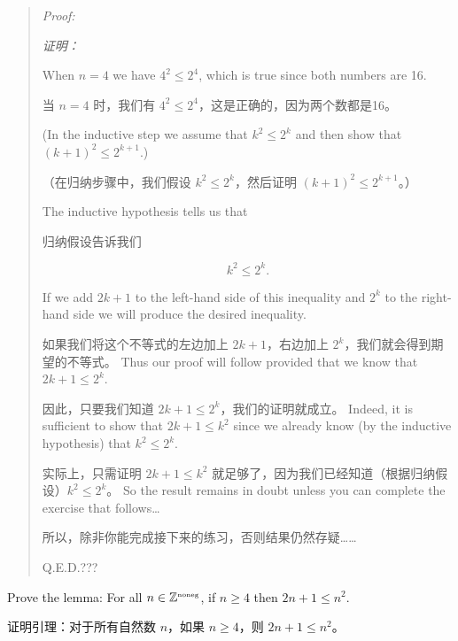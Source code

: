 \begin{quote} \emph{Proof:}

\emph{证明：}

 When $n=4$ we have $4^2 \leq 2^4$, which is 
true since both numbers are 16.

当 $n=4$ 时，我们有 $4^2 \leq 2^4$，这是正确的，因为两个数都是16。

 (In the inductive step we assume
that $k^2 \leq 2^k$ and then show that $(k+1)^2 \leq 2^{k+1}$.)

（在归纳步骤中，我们假设 $k^2 \leq 2^k$，然后证明 $(k+1)^2 \leq 2^{k+1}$。）

The inductive hypothesis tells us that 

归纳假设告诉我们

\[ k^2 \leq 2^k.
\]

 
If we add $2k+1$ to the left-hand side of this inequality
and $2^k$ to the right-hand side we will produce the desired
inequality.

如果我们将这个不等式的左边加上 $2k+1$，右边加上 $2^k$，我们就会得到期望的不等式。
Thus our proof will follow provided that
we know that $2k+1 \leq 2^k$.

因此，只要我们知道 $2k+1 \leq 2^k$，我们的证明就成立。
Indeed, it is sufficient to show
that $2k+1 \leq k^2$ since we already know (by the inductive
hypothesis) that $k^2 \leq 2^k$.

实际上，只需证明 $2k+1 \leq k^2$ 就足够了，因为我们已经知道（根据归纳假设）$k^2 \leq 2^k$。
So the result remains in doubt unless you can complete the 
exercise that follows\ldots

所以，除非你能完成接下来的练习，否则结果仍然存疑……

\rule{0pt}{0pt} \newline \rule{0pt}{15pt} \hfill Q.E.D.???
\end{quote}


\begin{exer} 
Prove the lemma:  For all $n \in {\mathbb Z}^{\mbox{\tiny noneg}}$, if $n \geq 4$ then
$2n+1 \leq n^2$.

证明引理：对于所有自然数 $n$，如果 $n \geq 4$，则 $2n+1 \leq n^2$。
\end{exer}

\newpage
  



